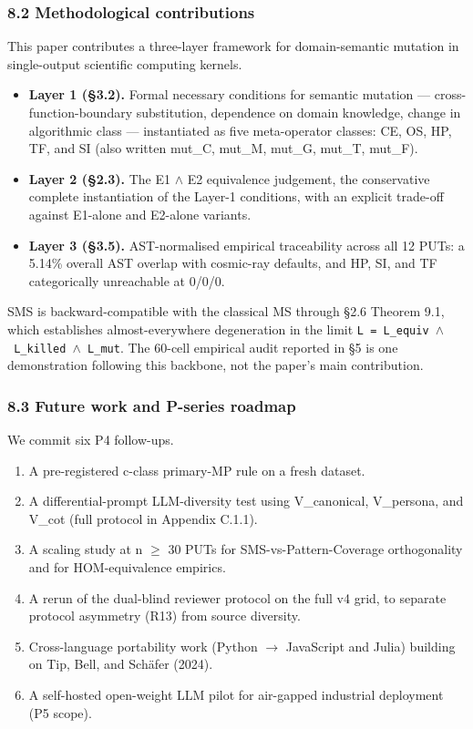 \documentclass[review,12pt,authoryear]{elsarticle}
\providecommand{\tightlist}{\setlength{\itemsep}{0pt}\setlength{\parskip}{0pt}}
\begin{document}
\subsubsection{8.2 Methodological
contributions}\label{methodological-contributions}

This paper contributes a three-layer framework for domain-semantic
mutation in single-output scientific computing kernels.

\begin{itemize}
\tightlist
\item
  \textbf{Layer 1 (§3.2).} Formal necessary conditions for semantic
  mutation --- cross-function-boundary substitution, dependence on
  domain knowledge, change in algorithmic class --- instantiated as five
  meta-operator classes: CE, OS, HP, TF, and SI (also written mut\_C,
  mut\_M, mut\_G, mut\_T, mut\_F).
\item
  \textbf{Layer 2 (§2.3).} The E1 $\wedge$ E2 equivalence judgement, the
  conservative complete instantiation of the Layer-1 conditions, with an
  explicit trade-off against E1-alone and E2-alone variants.
\item
  \textbf{Layer 3 (§3.5).} AST-normalised empirical traceability across
  all 12 PUTs: a 5.14\% overall AST overlap with cosmic-ray defaults,
  and HP, SI, and TF categorically unreachable at 0/0/0.
\end{itemize}

SMS is backward-compatible with the classical MS through §2.6 Theorem
9.1, which establishes almost-everywhere degeneration in the limit
\texttt{L\ =\ L\_equiv\ $\wedge$\ L\_killed\ $\wedge$\ L\_mut}. The 60-cell empirical
audit reported in §5 is one demonstration following this backbone, not
the paper's main contribution.

\subsubsection{8.3 Future work and P-series
roadmap}\label{future-work-and-p-series-roadmap}

We commit six P4 follow-ups.

\begin{enumerate}
\def\labelenumi{(\alph{enumi})}
\item
  A pre-registered c-class primary-MP rule on a fresh dataset.
\item
  A differential-prompt LLM-diversity test using V\_canonical,
  V\_persona, and V\_cot (full protocol in Appendix C.1.1).
\item
  A scaling study at n $\geq$ 30 PUTs for SMS-vs-Pattern-Coverage
  orthogonality and for HOM-equivalence empirics.
\item
  A rerun of the dual-blind reviewer protocol on the full v4 grid, to
  separate protocol asymmetry (R13) from source diversity.
\item
  Cross-language portability work (Python $\to$ JavaScript and Julia)
  building on Tip, Bell, and Schäfer (2024).
\item
  A self-hosted open-weight LLM pilot for air-gapped industrial
  deployment (P5 scope).
\end{enumerate}
\end{document}
